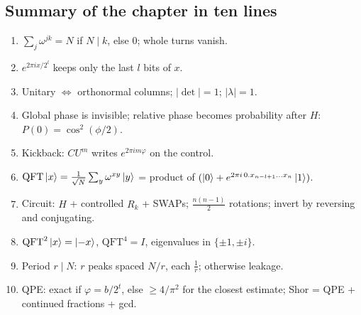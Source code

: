 \documentclass[11pt,a4paper,openany]{book}
\newcommand{\QFT}{\mathrm{QFT}}
\begin{document}
\subsection*{Summary of the chapter in ten lines}
\begin{enumerate}[itemsep=1pt]
\item $\sum_j\omega^{jk} = N$ if $N \mid k$, else $0$; whole turns vanish.
\item $e^{2\pi i x/2^l}$ keeps only the last $l$ bits of $x$.
\item Unitary $\Leftrightarrow$ orthonormal columns; $|\det| = 1$; $|\lambda| = 1$.
\item Global phase is invisible; relative phase becomes probability after $H$: $P(0) = \cos^2(\phi/2)$.
\item Kickback: $CU^m$ writes $e^{2\pi i m\varphi}$ on the control.
\item $\QFT\ket x = \frac{1}{\sqrt N}\sum_y\omega^{xy}\ket y$ = product of $(\ket0 + e^{2\pi i\,0.x_{n-l+1}\dots x_n}\ket1)$.
\item Circuit: $H$ + controlled $R_k$ + SWAPs; $\frac{n(n-1)}{2}$ rotations; invert by reversing and conjugating.
\item $\QFT^2\ket x = \ket{-x}$, $\QFT^4 = I$, eigenvalues in $\{\pm1, \pm i\}$.
\item Period $r \mid N$: $r$ peaks spaced $N/r$, each $\frac1r$; otherwise leakage.
\item QPE: exact if $\varphi = b/2^t$, else $\ge 4/\pi^2$ for the closest estimate; Shor = QPE + continued fractions + gcd.
\end{enumerate}
\end{document}
